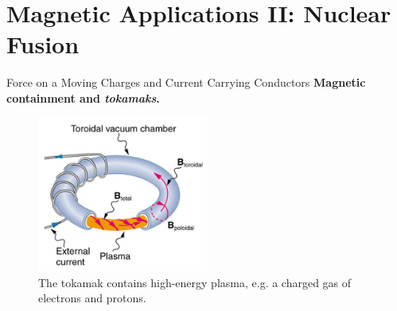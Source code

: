 \documentclass{beamer}
\begin{document}
\section{Magnetic Applications II: Nuclear Fusion}

\begin{frame}{Force on a Moving Charges and Current Carrying Conductors}
\textbf{Magnetic containment and \textit{tokamaks}.}
\begin{figure}
\centering
\includegraphics[width=0.5\textwidth]{figures/tokamak.png}
\caption{\label{fig:tokamak} The tokamak contains high-energy plasma, e.g. a charged gas of electrons and protons.}
\end{figure}
\end{frame}
\end{document}
